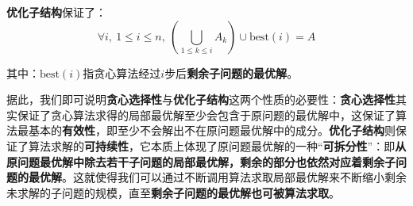 \documentclass[12pt,a4paper,violet,oneside]{bbe}
\begin{document}
\textbf{优化子结构}保证了：
$$
\forall i,~1\leqslant i\leqslant n,~\left(\bigcup\limits_{1\leqslant k\leqslant i}A_k\right)\cup\text{best}(i)=A
$$

其中：$\text{best}(i)$指贪心算法经过$i$步后\textbf{剩余子问题的最优解}。

据此，我们即可说明\textbf{贪心选择性}与\textbf{优化子结构}这两个性质的必要性：\textbf{贪心选择性}其实保证了贪心算法求得的局部最优解至少会包含于原问题的最优解中，这保证了算法最基本的\textbf{有效性}，即至少不会解出不在原问题最优解中的成分。\textbf{优化子结构}则保证了算法求解的\textbf{可持续性}，它本质上体现了原问题最优解的一种“\textbf{可拆分性}”：即\textbf{从原问题最优解中除去若干子问题的局部最优解，剩余的部分也依然对应着剩余子问题的最优解}。这就使得我们可以通过不断调用算法求取局部最优解来不断缩小剩余未求解的子问题的规模，直至\textbf{剩余子问题的最优解也可被算法求取}。
\end{document}
